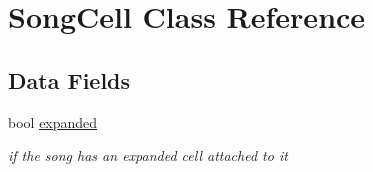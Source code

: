 \hypertarget{interface_song_cell}{\section{Song\-Cell Class Reference}
\label{interface_song_cell}
}
\subsection*{Data Fields}
\begin{DoxyCompactItemize}
\item 
\hypertarget{interface_song_cell_a509de781a41934b9e43ee410f0eb8a03}{bool \hyperlink{interface_song_cell_a509de781a41934b9e43ee410f0eb8a03}{expanded}}\label{interface_song_cell_a509de781a41934b9e43ee410f0eb8a03}

\begin{DoxyCompactList}\small\item\em if the song has an expanded cell attached to it \end{DoxyCompactList}\end{DoxyCompactItemize}
